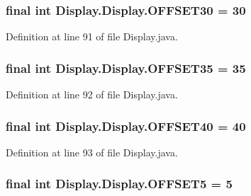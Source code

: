 \subsubsection[{O\+F\+F\+S\+E\+T30}]{\setlength{\rightskip}{0pt plus 5cm}final int Display.\+Display.\+O\+F\+F\+S\+E\+T30 = 30\hspace{0.3cm}{\ttfamily [static]}}\label{class_display_1_1_display_afbede7d7429e2ed899ae713864da8848}


Definition at line 91 of file Display.\+java.

\hypertarget{class_display_1_1_display_a9b88a4d575cdcdcfe550deeac1c147f4}{}
\subsubsection[{O\+F\+F\+S\+E\+T35}]{\setlength{\rightskip}{0pt plus 5cm}final int Display.\+Display.\+O\+F\+F\+S\+E\+T35 = 35\hspace{0.3cm}{\ttfamily [static]}}\label{class_display_1_1_display_a9b88a4d575cdcdcfe550deeac1c147f4}


Definition at line 92 of file Display.\+java.

\hypertarget{class_display_1_1_display_a6c71cd05e79a2e66cac7ac49d8a627b0}{}
\subsubsection[{O\+F\+F\+S\+E\+T40}]{\setlength{\rightskip}{0pt plus 5cm}final int Display.\+Display.\+O\+F\+F\+S\+E\+T40 = 40\hspace{0.3cm}{\ttfamily [static]}}\label{class_display_1_1_display_a6c71cd05e79a2e66cac7ac49d8a627b0}


Definition at line 93 of file Display.\+java.

\hypertarget{class_display_1_1_display_a265426fc52f9fc0f3cf08691bf8fc8bc}{}
\subsubsection[{O\+F\+F\+S\+E\+T5}]{\setlength{\rightskip}{0pt plus 5cm}final int Display.\+Display.\+O\+F\+F\+S\+E\+T5 = 5\hspace{0.3cm}{\ttfamily [static]}}\label{class_display_1_1_display_a265426fc52f9fc0f3cf08691bf8fc8bc}


